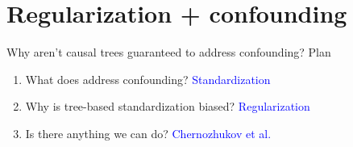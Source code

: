 \documentclass{beamer}
\newcommand{\blue}[1]{\textcolor{blue}{#1}}
\begin{document}
\section{Regularization + confounding}

\begin{frame}{Why aren't causal trees guaranteed to address confounding?}
Plan
\begin{enumerate}
\item What does address confounding? \blue{Standardization}
\item Why is tree-based standardization biased? \blue{Regularization}
\item Is there anything we can do? \blue{Chernozhukov et al.}
\end{enumerate}
\end{frame}
\end{document}
